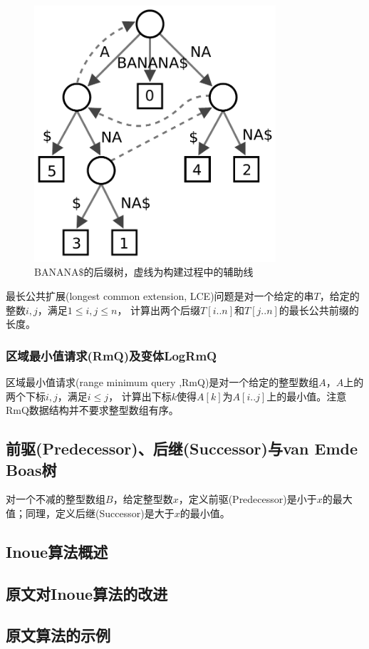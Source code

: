 \begin{figure}[h]
    \centering
    \includegraphics[width=0.8\textwidth]{resources/fig/Suffix_tree_BANANA}
    \caption{$\mathrm{BANANA\$}$的后缀树，虚线为构建过程中的辅助线\cite{suffix}}
\end{figure}

最长公共扩展(longest common extension, LCE)问题是对一个给定的串$T$，给定的整数$i,j$，满足$1 \leq i,j \leq n$，
计算出两个后缀$T[i..n]$和$T[j..n]$的最长公共前缀的长度。

\subsubsection{区域最小值请求(RmQ)及变体LogRmQ}\label{subsubsec:rmq}

区域最小值请求(range minimum query ,RmQ)是对一个给定的整型数组$A$，$A$上的两个下标$i,j$，满足$i \leq j$，
计算出下标$k$使得$A[k]$为$A[i..j]$上的最小值。注意RmQ数据结构并不要求整型数组有序。

\subsection{前驱(Predecessor)、后继(Successor)与van Emde Boas树}\label{subsec:van}

对一个不减的整型数组$B$，给定整型数$x$，定义前驱(Predecessor)是小于$x$的最大值；同理，定义后继(Successor)是大于$x$的最小值。

\subsection{Inoue算法概述}\label{subsec:inoue}

\subsection{原文对Inoue算法的改进}\label{subsec:progress}

\subsection{原文算法的示例}\label{subsec:example}
